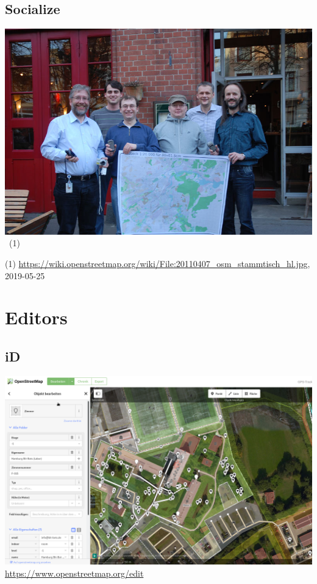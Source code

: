 \documentclass{beamer}
\begin{document}
	\subsection{Socialize}
	
	\begin{frame}
		\begin{center}
			\includegraphics[width=0.8\linewidth,height=0.8\textheight,keepaspectratio]{images/socializing}~\tiny{(1)}
		\end{center}
		{\tiny (1) \url{https://wiki.openstreetmap.org/wiki/File:20110407_osm_stammtisch_hl.jpg}, 2019-05-25}
	\end{frame}
	
	\section{Editors}
	
	\subsection{iD}
	
	\begin{frame}
		\begin{center}
			\includegraphics[width=0.9\linewidth,height=0.9\textheight,keepaspectratio]{images/id-editor}
			\url{https://www.openstreetmap.org/edit}
		\end{center}
	\end{frame}
	
\end{document}
